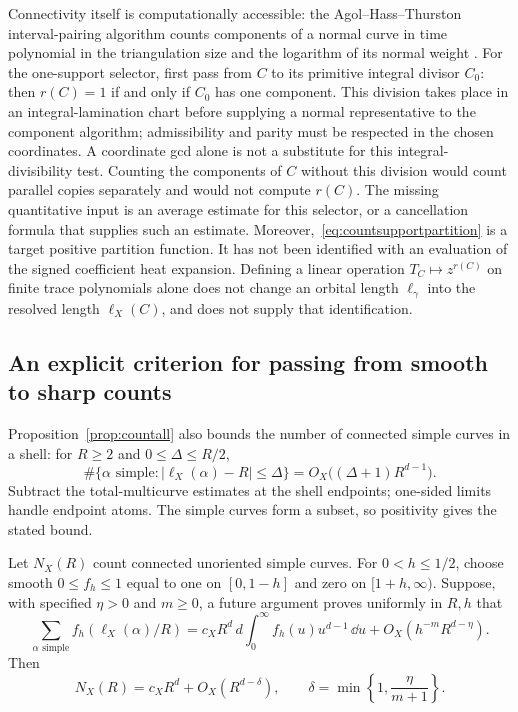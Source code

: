 Connectivity itself is computationally accessible: the
Agol--Hass--Thurston interval-pairing algorithm counts components
of a normal curve in time polynomial in the triangulation size
and the logarithm of its normal weight
\cite[Theorem 12 and Corollary 13]{AHTComponents}.
For the one-support selector, first pass from $C$ to its primitive
integral divisor $C_0$: then $r(C)=1$ if and only if $C_0$ has one
component. This division takes place in an integral-lamination
chart before supplying a normal representative to the component
algorithm; admissibility and parity must be respected in the
chosen coordinates. A coordinate gcd alone is not a substitute
for this integral-divisibility test.
Counting the components of $C$ without this division would count
parallel copies separately and would not compute $r(C)$.
The missing quantitative input is an average estimate for this
selector, or a cancellation formula that supplies such an estimate.
Moreover,~\eqref{eq:countsupportpartition} is a target positive
partition function. It has not been identified with an evaluation
of the signed coefficient heat expansion. Defining a linear
operation $T_C\mapsto z^{r(C)}$ on finite trace polynomials alone
does not change an orbital length $\ell_\gamma$ into the resolved
length $\ell_X(C)$, and does not supply that identification.


\subsection{An explicit criterion for passing from smooth to sharp counts}
\label{subsec:countdesmooth}

Proposition~\ref{prop:countall} also bounds the number of connected
simple curves in a shell: for $R\geq2$ and $0\leq\Delta\leq R/2$,
\begin{equation}
 \#\{\alpha\text{ simple}:|\ell_X(\alpha)-R|\leq\Delta\}
       =O_X\bigl((\Delta+1)R^{d-1}\bigr).
 \label{eq:countshell}
\end{equation}
Subtract the total-multicurve estimates at the shell endpoints;
one-sided limits handle endpoint atoms.  The simple curves form a
subset, so positivity gives the stated bound.

\begin{proposition}
\label{prop:countdesmooth}
Let $N_X(R)$ count connected unoriented simple curves.  For
$0<h\leq1/2$, choose smooth $0\leq f_h\leq1$
equal to one on $[0,1-h]$ and zero on
$[1+h,\infty)$.  Suppose, with specified $\eta>0$ and
$m\geq0$, a future argument proves uniformly in $R,h$ that
\begin{equation}
 \sum_{\alpha\text{ simple}}f_h(\ell_X(\alpha)/R)
 =c_XR^d\,d\!\int_0^\infty
             f_h(u)u^{d-1}\,\dd u
   +O_X(h^{-m}R^{d-\eta}).
 \label{eq:countsmoothhypothesis}
\end{equation}
Then
\begin{equation}
 \boxed{N_X(R)=c_XR^d+O_X(R^{d-\delta}),\qquad
        \delta=\min\left\{1,\frac\eta{m+1}\right\}.}
 \label{eq:countsharpconditional}
\end{equation}
\end{proposition}

